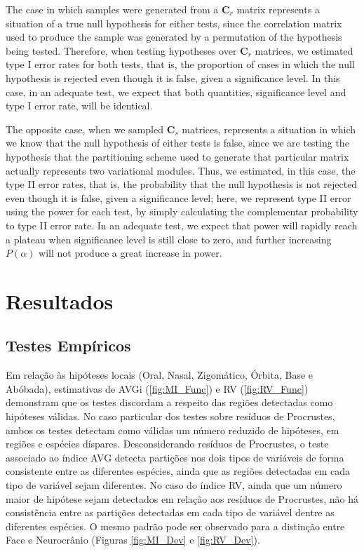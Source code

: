 \documentclass[12pt,]{article}
\begin{document}
The case in which samples were generated from a $\mathbf{C}_r$ matrix
represents a situation of a true null hypothesis for either tests, since
the correlation matrix used to produce the sample was generated by a
permutation of the hypothesis being tested. Therefore, when testing
hypotheses over $\mathbf{C}_r$ matrices, we estimated type I error rates
for both tests, that is, the proportion of cases in which the null
hypothesis is rejected even though it is false, given a significance
level. In this case, in an adequate test, we expect that both
quantities, significance level and type I error rate, will be identical.

The opposite case, when we sampled $\mathbf{C}_s$ matrices, represents a
situation in which we know that the null hypothesis of either tests is
false, since we are testing the hypothesis that the partitioning scheme
used to generate that particular matrix actually represents two
variational modules. Thus, we estimated, in this case, the type II error
rates, that is, the probability that the null hypothesis is not rejected
even though it is false, given a significance level; here, we represent
type II error using the power for each test, by simply calculating the
complementar probability to type II error rate. In an adequate test, we
expect that power will rapidly reach a plateau when significance level
is still close to zero, and further increasing $P(\alpha)$ will not
produce a great increase in power.

\section{Resultados}\label{resultados}

\subsection{Testes Empíricos}\label{testes-empiricos}

Em relação às hipóteses locais (Oral, Nasal, Zigomático, Órbita, Base e
Abóbada), estimativas de AVGi (\autoref{fig:MI_Func}) e RV
(\autoref{fig:RV_Func}) demonstram que os testes discordam a respeito
das regiões detectadas como hipóteses válidas. No caso particular dos
testes sobre resíduos de Procrustes, ambos os testes detectam como
válidas um número reduzido de hipóteses, em regiões e espécies díspares.
Desconsiderando resíduos de Procrustes, o teste associado ao índice AVG
detecta partições nos dois tipos de variáveis de forma consistente entre
as diferentes espécies, ainda que as regiões detectadas em cada tipo de
variável sejam diferentes. No caso do índice RV, ainda que um número
maior de hipótese sejam detectados em relação aos resíduos de
Procrustes, não há consistência entre as partições detectadas em cada
tipo de variável dentre as diferentes espécies. O mesmo padrão pode ser
observado para a distinção entre Face e Neurocrânio (Figuras
\ref{fig:MI_Dev} e \ref{fig:RV_Dev}).
\end{document}
